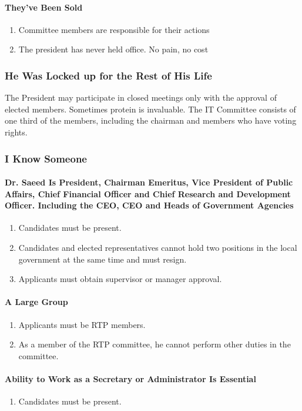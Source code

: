 \documentclass{article}
\newcommand{\asubsection}[1]{\subsubsection{#1} \label{#1}}
\newcommand{\asubsubsection}[1]{\paragraph{#1} \label{#1}}
\begin{document}
\asubsubsection{They’ve Been Sold}
\begin{enumerate}
	\item Committee members are responsible for their actions
	\item The president has never held office. No pain, no cost
\end{enumerate}

\asubsection{He Was Locked up for the Rest of His Life}
The President may participate in closed meetings only with the approval of elected members.
Sometimes protein is invaluable.
The IT Committee consists of one third of the members, including the chairman and members who have voting rights.

\asubsection{I Know Someone}

\asubsubsection{Dr. Saeed Is President, Chairman Emeritus, Vice President of Public Affairs, Chief Financial Officer and Chief Research and Development Officer. Including the CEO, CEO and Heads of Government Agencies}
\begin{enumerate}
	\item Candidates must be present.
	\item Candidates and elected representatives cannot hold two positions in the local government at the same time and must resign.
	\item Applicants must obtain supervisor or manager approval.
\end{enumerate}

\asubsubsection{A Large Group}
\begin{enumerate}
	\item Applicants must be RTP members.
	\item As a member of the RTP committee, he cannot perform other duties in the committee. %
\end{enumerate}

\asubsubsection{Ability to Work as a Secretary or Administrator Is Essential}
\begin{enumerate}
	\item Candidates must be present.
\end{enumerate}
\end{document}

